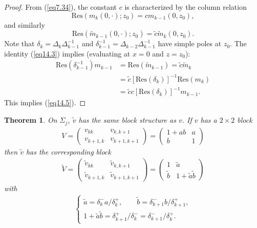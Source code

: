 \documentclass{surv-l}
\theoremstyle{plain}
\newtheorem{theorem}{Theorem}[section]
\theoremstyle{definition}
\numberwithin{equation}{chapter}
\begin{document}
\begin{proof}
From (\ref{eq7.34}), the constant $c$ is characterized by the column relation
\begin{equation*}
\mathrm{Res}(m_{k}(0, \cdot); z_{0})=cm_{k-1}(0, z_{0}),
\end{equation*}
and similarly
\begin{equation*}
\mathrm{Res}(\tilde{m}_{k-1}(0, \cdot);z_{0})=\tilde{c}\tilde{m}_{k}(0, z_{0}).
\end{equation*}
Note that $\delta_{k}=\Delta_{k}\Delta_{k-1}^{-1}$ and $\delta_{k-1}^{-1}=\Delta_{k-2}\Delta_{k-1}^{-1}$ have simple poles at $z_{0}$. The identity (\ref{eq14.3}) implies (evaluating at $x=0$ and $z=z_{0}$):
\begin{align*}
\mathrm{Res}(\delta_{k-1}^{-1})m_{k-1}&=\mathrm{Res}(\tilde{m}_{k-1})=\tilde{c}\tilde{m}_{k}\\
&=\tilde{c}[\mathrm{Res}(\delta_{k})]^{-1}\mathrm{Res}(m_{k})\\
&=\tilde{c}c[\mathrm{Res}(\delta_{k})]^{-1}m_{k-1}.
\end{align*}
This implies (\ref{eq14.5}).
\end{proof}
\setcounter{theorem}{5}
\begin{theorem}\label{thm14.6}
On $\Sigma_{j}$, $\tilde{v}$ has the same block structure as $v$. If $v$ has a $2\times 2$ block
\setcounter{equation}{6}
\begin{align}\label{eq14.7}
V=\left(\begin{array}{cc}
  v_{kk} & v_{k,k+1} \\
  v_{k+1,k} & v_{k+1,k+1}
\end{array}\right)=\left(\begin{array}{cc}
              1+ab  & a \\
              b & 1
            \end{array}\right)
\end{align}
then $\tilde{v}$ has the corresponding block
\begin{align}\label{eq14.8}
\tilde{V}=\left(\begin{array}{cc}
  \tilde{v}_{kk} & \tilde{v}_{k,k+1} \\
  \tilde{v}_{k+1,k} & \tilde{v}_{k+1,k+1}
\end{array}\right)=\left(\begin{array}{cc}
              1  & \tilde{a} \\
              \tilde{b} & 1+\tilde{a}\tilde{b}
            \end{array}\right)
\end{align}
with
\begin{align}\label{eq14.9}
\left\{\begin{array}{l}
\tilde{a}=\delta_{k}^{-}a/\delta_{k}^{+},\qquad \tilde{b}=\delta_{k+1}^{-}b/\delta_{k+1}^{+},\\
1+\tilde{a}\tilde{b}=\delta_{k+1}^{+}/\delta_{k}^{-}=\delta_{k+1}^{-}/\delta_{k}^{+}.
\end{array}\right.
\end{align}
\end{theorem}
\end{document}
